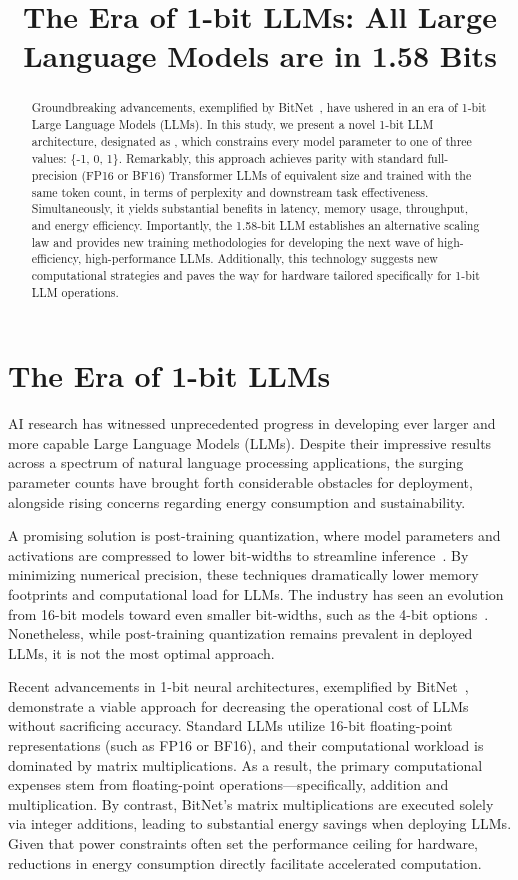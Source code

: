 \title{The Era of 1-bit LLMs: All Large Language Models are in 1.58 Bits}

\begin{abstract}
Groundbreaking advancements, exemplified by BitNet~\cite{bitnet}, have ushered in an era of 1-bit Large Language Models (LLMs). In this study, we present a novel 1-bit LLM architecture, designated as \textbf{}, which constrains every model parameter to one of three values: \{-1, 0, 1\}. Remarkably, this approach achieves parity with standard full-precision (FP16 or BF16) Transformer LLMs of equivalent size and trained with the same token count, in terms of perplexity and downstream task effectiveness. Simultaneously, it yields substantial benefits in latency, memory usage, throughput, and energy efficiency. Importantly, the 1.58-bit LLM establishes an alternative scaling law and provides new training methodologies for developing the next wave of high-efficiency, high-performance LLMs. Additionally, this technology suggests new computational strategies and paves the way for hardware tailored specifically for 1-bit LLM operations.
\end{abstract}

\section{The Era of 1-bit LLMs}

AI research has witnessed unprecedented progress in developing ever larger and more capable Large Language Models (LLMs). Despite their impressive results across a spectrum of natural language processing applications, the surging parameter counts have brought forth considerable obstacles for deployment, alongside rising concerns regarding energy consumption and sustainability.

A promising solution is post-training quantization, where model parameters and activations are compressed to lower bit-widths to streamline inference~\cite{smoothquant, gptq, quip, quip_sharp}. By minimizing numerical precision, these techniques dramatically lower memory footprints and computational load for LLMs. The industry has seen an evolution from 16-bit models toward even smaller bit-widths, such as the 4-bit options~\cite{gptq, awq}. Nonetheless, while post-training quantization remains prevalent in deployed LLMs, it is not the most optimal approach.

Recent advancements in 1-bit neural architectures, exemplified by BitNet~\cite{bitnet}, demonstrate a viable approach for decreasing the operational cost of LLMs without sacrificing accuracy. Standard LLMs utilize 16-bit floating-point representations (such as FP16 or BF16), and their computational workload is dominated by matrix multiplications. As a result, the primary computational expenses stem from floating-point operations—specifically, addition and multiplication. By contrast, BitNet’s matrix multiplications are executed solely via integer additions, leading to substantial energy savings when deploying LLMs. Given that power constraints often set the performance ceiling for hardware, reductions in energy consumption directly facilitate accelerated computation.

